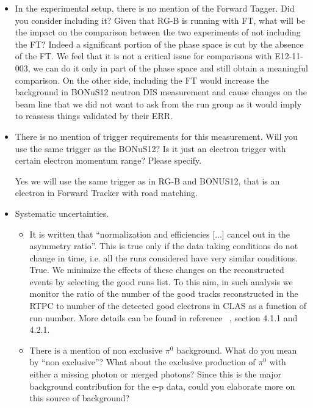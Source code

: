 \begin{itemize}
\item In the experimental setup, there is no mention of the Forward Tagger.  
   Did you consider including it? Given that RG-B is running with FT, what will 
   be the impact on the comparison between the two experiments of not including 
   the FT?
{\color{red} Indeed a significant portion of the phase space is cut by the 
absence of the FT. We feel that it is not a critical issue for comparisons with 
E12-11-003, we can do it only in part of the phase space and still obtain
a meaningful comparison. On the other side, including the FT would increase the 
background in BONuS12 neutron DIS measurement and cause changes on the beam 
line that we did not want to ask from the run group as it would imply to 
reassess things validated by their ERR.}

\item There is no mention of trigger requirements for this measurement. Will 
   you use the same trigger as the BONuS12? Is it just an electron trigger with 
   certain electron momentum range? Please specify.
  
{\color{red} Yes we will use the same trigger as in RG-B and BONUS12, that is 
an electron in Forward Tracker with road matching.}

\item Systematic uncertainties.  \begin{itemize}
\item  It is written that ``normalization and efficiencies [...] cancel out in 
   the asymmetry ratio''. This is true only if the data taking conditions do 
      not change in time, i.e. all the runs considered have very similar 
      conditions.\\
{\color{red} True. We minimize the effects of these changes on the reconstructed
events by selecting the good runs list. To this aim, in such analysis we 
      monitor the ratio of the number of the good tracks reconstructed in the 
      RTPC to number of the detected good electrons in CLAS as a function of 
      run number. More details can be found in reference ~\cite{eg6_note}, 
      section 4.1.1 and 4.2.1. }

 \item There is a mention of non exclusive $\pi^0$ background. What do you mean 
    by ``non exclusive''? What about the exclusive production of $\pi^0$ with 
      either a missing photon or merged photons? Since this is the major 
      background contribution for the e-p data, could you elaborate more on 
      this source of background?


\end{itemize}
\end{itemize}
